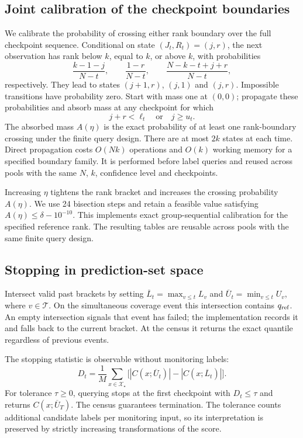 \documentclass[preprint,12pt]{elsarticle}
\begin{document}
\subsection{Joint calibration of the checkpoint boundaries}\label{sec:joint}
We calibrate the probability of crossing either rank boundary over the full checkpoint sequence. Conditional on state $(J_t,R_t)=(j,r)$, the next observation has rank below $k$, equal to $k$, or above $k$, with probabilities
\begin{equation}
 \frac{k-1-j}{N-t},\qquad
 \frac{1-r}{N-t},\qquad
 \frac{N-k-t+j+r}{N-t},
 \label{eq:transition}
\end{equation}
respectively. They lead to states $(j+1,r)$, $(j,1)$ and $(j,r)$. Impossible transitions have probability zero. Start with mass one at $(0,0)$; propagate these probabilities and absorb mass at any checkpoint for which
\begin{equation}
 j+r<\ell_t\quad\text{or}\quad j\ge u_t.
 \label{eq:crossing}
\end{equation}
The absorbed mass $A(\eta)$ is the exact probability of at least one rank-boundary crossing under the finite query design. There are at most $2k$ states at each time. Direct propagation costs $O(Nk)$ operations and $O(k)$ working memory for a specified boundary family. It is performed before label queries and reused across pools with the same $N$, $k$, confidence level and checkpoints.

Increasing $\eta$ tightens the rank bracket and increases the crossing probability $A(\eta)$. We use 24 bisection steps and retain a feasible value satisfying $A(\eta)\le\delta-10^{-10}$. This implements exact group-sequential calibration \cite{jin} for the specified reference rank. The resulting tables are reusable across pools with the same finite query design.

\subsection{Stopping in prediction-set space}
Intersect valid past brackets by setting $\overline L_t=\max_{v\le t}L_v$ and $\overline U_t=\min_{v\le t}U_v$, where $v\in\mathcal T$. On the simultaneous coverage event this intersection contains $q_{\rm ref}$. An empty intersection signals that event has failed; the implementation records it and falls back to the current bracket. At the census it returns the exact quantile regardless of previous events.

The stopping statistic is observable without monitoring labels:
\begin{equation}
 D_t=\frac1M\sum_{x\in\mathcal X_\star}
 \bigl[|C(x;\overline U_t)|-|C(x;\overline L_t)|\bigr].
 \label{eq:width}
\end{equation}
For tolerance $\tau\ge0$, querying stops at the first checkpoint with $D_t\le\tau$ and returns $C(x;\overline U_T)$. The census guarantees termination. The tolerance counts additional candidate labels per monitoring input, so its interpretation is preserved by strictly increasing transformations of the score.
\end{document}
